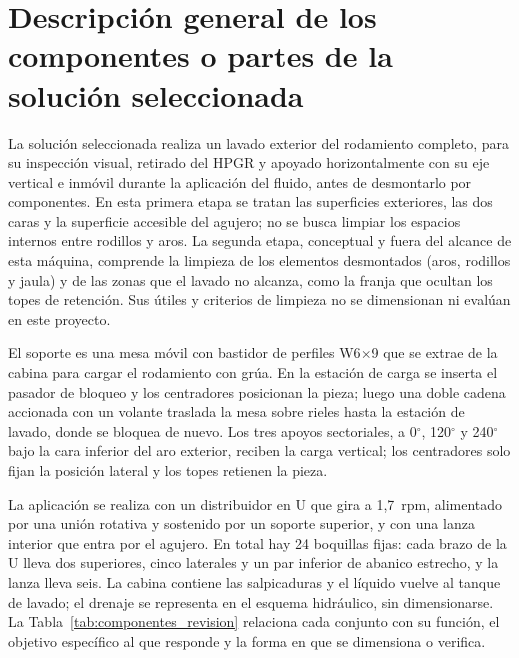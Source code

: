 \section{Descripción general de los componentes o partes de la solución seleccionada}

La solución seleccionada realiza un lavado exterior del rodamiento completo, para su inspección visual, retirado del HPGR y apoyado horizontalmente con su eje vertical e inmóvil durante la aplicación del fluido, antes de desmontarlo por componentes. En esta primera etapa se tratan las superficies exteriores, las dos caras y la superficie accesible del agujero; no se busca limpiar los espacios internos entre rodillos y aros. La segunda etapa, conceptual y fuera del alcance de esta máquina, comprende la limpieza de los elementos desmontados (aros, rodillos y jaula) y de las zonas que el lavado no alcanza, como la franja que ocultan los topes de retención. Sus útiles y criterios de limpieza no se dimensionan ni evalúan en este proyecto.

El soporte es una mesa móvil con bastidor de perfiles W6$\times$9 que se extrae de la cabina para cargar el rodamiento con grúa. En la estación de carga se inserta el pasador de bloqueo y los centradores posicionan la pieza; luego una doble cadena accionada con un volante traslada la mesa sobre rieles hasta la estación de lavado, donde se bloquea de nuevo. Los tres apoyos sectoriales, a 0$^\circ$, 120$^\circ$ y 240$^\circ$ bajo la cara inferior del aro exterior, reciben la carga vertical; los centradores solo fijan la posición lateral y los topes retienen la pieza.

La aplicación se realiza con un distribuidor en U que gira a 1,7~rpm, alimentado por una unión rotativa y sostenido por un soporte superior, y con una lanza interior que entra por el agujero. En total hay 24 boquillas fijas: cada brazo de la U lleva dos superiores, cinco laterales y un par inferior de abanico estrecho, y la lanza lleva seis. La cabina contiene las salpicaduras y el líquido vuelve al tanque de lavado; el drenaje se representa en el esquema hidráulico, sin dimensionarse. La Tabla~\ref{tab:componentes_revision} relaciona cada conjunto con su función, el objetivo específico al que responde y la forma en que se dimensiona o verifica.

